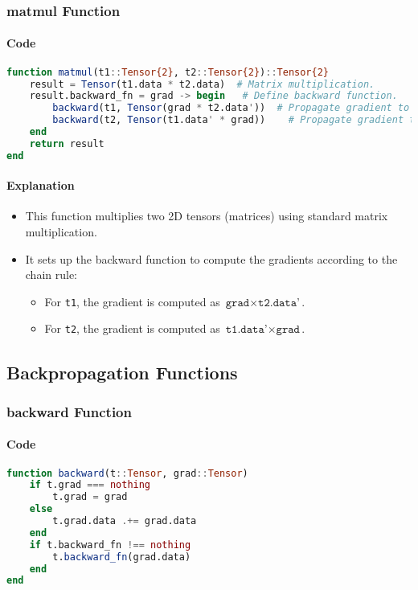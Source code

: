 \documentclass[11pt]{article}
\begin{document}
\subsubsection{matmul Function}
\paragraph{Code}
\begin{lstlisting}[language=Julia]
function matmul(t1::Tensor{2}, t2::Tensor{2})::Tensor{2}
    result = Tensor(t1.data * t2.data)  # Matrix multiplication.
    result.backward_fn = grad -> begin   # Define backward function.
        backward(t1, Tensor(grad * t2.data'))  # Propagate gradient to t1.
        backward(t2, Tensor(t1.data' * grad))    # Propagate gradient to t2.
    end
    return result
end
\end{lstlisting}

\paragraph{Explanation}
\begin{itemize}
    \item This function multiplies two 2D tensors (matrices) using standard matrix multiplication.
    \item It sets up the backward function to compute the gradients according to the chain rule:
    \begin{itemize}
        \item For \texttt{t1}, the gradient is computed as \(\texttt{grad} \times \texttt{t2.data'}\).
        \item For \texttt{t2}, the gradient is computed as \(\texttt{t1.data'} \times \texttt{grad}\).
    \end{itemize}
\end{itemize}

\subsection{Backpropagation Functions}
\subsubsection{backward Function}
\paragraph{Code}
\begin{lstlisting}[language=Julia]
function backward(t::Tensor, grad::Tensor)
    if t.grad === nothing
        t.grad = grad
    else
        t.grad.data .+= grad.data
    end
    if t.backward_fn !== nothing
        t.backward_fn(grad.data)
    end
end
\end{lstlisting}
\end{document}
